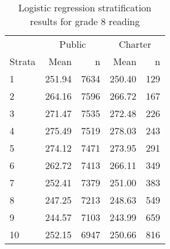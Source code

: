 \begin{table}[h!]
\centering
\caption{Logistic regression stratification results for grade 8 reading} 
\label{g8read-circpsa10}
\begin{tabular}{lrr@{\extracolsep{.2cm}}rr}
  \hline
   & \multicolumn{2}{c}{Public} & \multicolumn{2}{c}{Charter} \\ \cline{2-3} \cline{4-5} Strata & Mean & n & Mean & n \\ \hline
1 & 251.94 & 7634 & 250.40 & 129 \\ 
  2 & 264.16 & 7596 & 266.72 & 167 \\ 
  3 & 271.47 & 7535 & 272.48 & 226 \\ 
  4 & 275.49 & 7519 & 278.03 & 243 \\ 
  5 & 274.12 & 7471 & 273.95 & 291 \\ 
  6 & 262.72 & 7413 & 266.11 & 349 \\ 
  7 & 252.41 & 7379 & 251.00 & 383 \\ 
  8 & 247.25 & 7213 & 248.63 & 549 \\ 
  9 & 244.57 & 7103 & 243.99 & 659 \\ 
  10 & 252.15 & 6947 & 250.66 & 816 \\ 
   \hline
\end{tabular}
\end{table}
